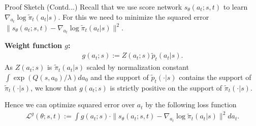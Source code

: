 \documentclass[aspectratio=169,xcolor=dvipsnames]{beamer}
\newcommand{\cL}{\mathcal{L}}
\newcommand{\lm}{\lambda}
\newcommand{\te}{\theta}
\newcommand{\nal}[1]{\begin{align*}#1\end{align*}}
\newcommand{\al}[1]{\begin{align}#1\end{align}}
\begin{document}
\begin{frame}{Proof Sketch (Contd...)}
    Recall that we use score network $s_{\te}(a_t;s,t)$ to learn $\nabla_{a_t}\log\tilde{\pi}_t(a_t|s)$. For this we need to minimize the squared error $\|s_{\te}(a_t;s,t)-\nabla_{a_t}\log\tilde{\pi}_t(a_t|s)\|^2$.
    
    \textbf{Weight function $g$:} 
    \nal{
    g(a_t;s):= Z(a_t;s)\tilde{p}_t(a_t|s).
    }
   As $Z(a_t;s)$ is $\tilde{\pi}_t(a_t|s)$ scaled by normalization constant $\int \exp(Q(s,a_0)/\lm)da_0$ and the support of $\tilde{p}_t(\cdot|s)$ contains the support of 
 $\tilde{\pi}_t(\cdot|s)$, we know that $g(a_t;s)$ is strictly positive on the support of $\tilde{\pi}_t(\cdot|s)$.

 Hence we can optimize squared error over $a_t$ by the following loss function
 \al{
    \cL^{g}(\te;s,t) := \int g(a_t;s)\cdot\|s_{\te}(a_t;s,t)-\nabla_{a_t}\log\tilde{\pi}_t(a_t|s)\|^2 da_t. \label{eq:13}
 }
\end{frame}
\end{document}
